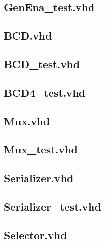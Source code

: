 \documentclass[10pt,spanish,a4paper,openany,notitlepage]{article}
\begin{document}
\subsection{GenEna\_test.vhd}

\newpage

\subsection{BCD.vhd}

\newpage

\subsection{BCD\_test.vhd}

\newpage

\subsection{BCD4\_test.vhd}

\newpage

\subsection{Mux.vhd}

\newpage

\subsection{Mux\_test.vhd}

\newpage


\subsection{Serializer.vhd}

\newpage

\subsection{Serializer\_test.vhd}

\newpage

\subsection{Selector.vhd}

\newpage
\end{document}
